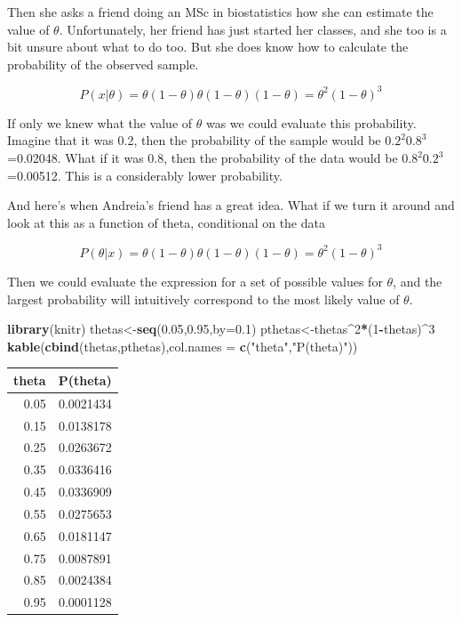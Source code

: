 \documentclass[
]{book}
\newenvironment{Shaded}{\begin{snugshade}}{\end{snugshade}}
\newcommand{\AttributeTok}[1]{\textcolor[rgb]{0.13,0.29,0.53}{#1}}
\newcommand{\DecValTok}[1]{\textcolor[rgb]{0.00,0.00,0.81}{#1}}
\newcommand{\FloatTok}[1]{\textcolor[rgb]{0.00,0.00,0.81}{#1}}
\newcommand{\FunctionTok}[1]{\textcolor[rgb]{0.13,0.29,0.53}{\textbf{#1}}}
\newcommand{\NormalTok}[1]{#1}
\newcommand{\OtherTok}[1]{\textcolor[rgb]{0.56,0.35,0.01}{#1}}
\newcommand{\SpecialCharTok}[1]{\textcolor[rgb]{0.81,0.36,0.00}{\textbf{#1}}}
\newcommand{\StringTok}[1]{\textcolor[rgb]{0.31,0.60,0.02}{#1}}
\begin{document}
Then she asks a friend doing an MSc in biostatistics how she can estimate the value of \(\theta\). Unfortunately, her friend has just started her classes, and she too is a bit unsure about what to do too. But she does know how to calculate the probability of the observed sample.

\[P(x|\theta)=\theta (1-\theta) \theta (1-\theta)  (1-\theta)=\theta^2 (1-\theta)^3\]

If only we knew what the value of \(\theta\) was we could evaluate this probability. Imagine that it was 0.2, then the probability of the sample would be \(0.2^2 0.8^3\)=0.02048. What if it was 0.8, then the probability of the data would be \(0.8^2 0.2^3\)=0.00512. This is a considerably lower probability.

And here's when Andreia's friend has a great idea. What if we turn it around and look at this as a function of theta, conditional on the data

\[P(\theta|x)=\theta (1-\theta)  \theta (1-\theta) (1-\theta)=\theta^2 (1-\theta)^3\]

Then we could evaluate the expression for a set of possible values for \(\theta\), and the largest probability will intuitively correspond to the most likely value of \(\theta\).

\begin{Shaded}
\begin{Highlighting}[]
\FunctionTok{library}\NormalTok{(knitr)}
\NormalTok{thetas}\OtherTok{\textless{}{-}}\FunctionTok{seq}\NormalTok{(}\FloatTok{0.05}\NormalTok{,}\FloatTok{0.95}\NormalTok{,}\AttributeTok{by=}\FloatTok{0.1}\NormalTok{)}
\NormalTok{pthetas}\OtherTok{\textless{}{-}}\NormalTok{thetas}\SpecialCharTok{\^{}}\DecValTok{2}\SpecialCharTok{*}\NormalTok{(}\DecValTok{1}\SpecialCharTok{{-}}\NormalTok{thetas)}\SpecialCharTok{\^{}}\DecValTok{3}
\FunctionTok{kable}\NormalTok{(}\FunctionTok{cbind}\NormalTok{(thetas,pthetas),}\AttributeTok{col.names =} \FunctionTok{c}\NormalTok{(}\StringTok{"theta"}\NormalTok{,}\StringTok{"P(theta)"}\NormalTok{))}
\end{Highlighting}
\end{Shaded}

\begin{tabular}{r|r}
\hline
theta & P(theta)\\
\hline
0.05 & 0.0021434\\
\hline
0.15 & 0.0138178\\
\hline
0.25 & 0.0263672\\
\hline
0.35 & 0.0336416\\
\hline
0.45 & 0.0336909\\
\hline
0.55 & 0.0275653\\
\hline
0.65 & 0.0181147\\
\hline
0.75 & 0.0087891\\
\hline
0.85 & 0.0024384\\
\hline
0.95 & 0.0001128\\
\hline
\end{tabular}
\end{document}
